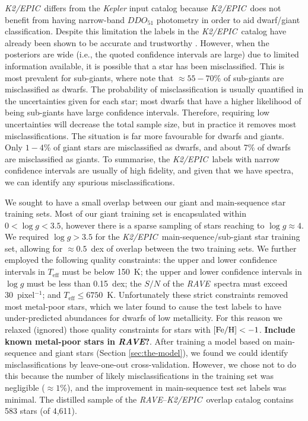 \documentclass[preprint,trackchanges]{aastex}
\newcommand{\acronym}[1]{{\small{#1}}}
\newcommand{\project}[1]{\textsl{#1}}
\newcommand{\rave}{\project{\acronym{RAVE}}}
\newcommand{\epic}{\project{K2/EPIC}}
\newcommand{\stub}[1]{{\color{blue} \textbf{#1}}}
\newcommand{\teff}{T_{\mathrm{eff}}}
\newcommand{\logg}{\log g}
\begin{document}
\epic\ differs from the \project{Kepler} input catalog because \epic\ does not 
benefit from having narrow-band $DDO_{51}$ photometry in order to aid dwarf/giant 
classification.  Despite this limitation the labels in the \epic\ catalog have 
already been shown to be accurate and trustworthy \citep{Huber_2016}.  However, 
when the posteriors are wide (i.e., the quoted confidence intervals are large) 
due to limited information available, it is possible that a star has been 
misclassified.  This is most prevalent for sub-giants, where \citet{Huber_2016} 
note that $\approx55-70$\% of sub-giants are misclassified as dwarfs.  The 
probability of misclassification is usually quantified in the uncertainties given
for each star; most dwarfs that have a higher likelihood of being sub-giants have
large confidence intervals.  Therefore, requiring low uncertainties will decrease 
the total sample size, but in practice it removes most misclassifications.  The 
situation is far more favourable for dwarfs and giants.  Only $1-4$\% of giant 
stars are misclassified as dwarfs, and about 7\% of dwarfs are misclassified as 
giants.  To summarise, the \epic\ labels with narrow confidence intervals are 
usually of high fidelity, and given that we have spectra, we can identify any
spurious misclassifications.


We sought to have a small overlap between our giant and main-sequence star training
sets.  Most of our giant training set is encapsulated within $0 < \logg < 3.5$, 
however there is a sparse sampling of stars reaching to $\logg \approx 4$.  We
required $\logg > 3.5$ for the \epic\ main-sequence/sub-giant star training set,
allowing for $\approx0.5$~dex of overlap between the two training sets.  We further
employed the following quality constraints: the upper and lower confidence intervals 
in $\teff$ must be below 150~K; the upper and lower confidence intervals in $\logg$ 
must be less than 0.15~dex; the $S/N$ of the \rave\ spectra must exceed 
30~pixel$^{-1}$; and $\teff \leqslant 6750$~K.  Unfortunately these strict constraints
removed most metal-poor stars, which we later found to cause the test labels to have
under-predicted abundances for dwarfs of low metallicity.  For this reason we relaxed
(ignored) those quality constraints for stars with $[{\rm Fe/H}] < -1$.  
\stub{Include known metal-poor stars in \rave?}. After training
a model based on main-sequence and giant stars (Section \ref{sec:the-model}), we found 
we could identify misclassifications by leave-one-out cross-validation.  However, we 
chose not to do this because the number of likely misclassifications in the training
set was negligible ($\approx1$\%), and the improvement in main-sequence test set labels
was minimal.  The distilled sample of the \rave--\epic\ overlap catalog contains 583 
stars (of 4,611).
\end{document}
